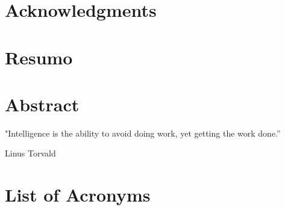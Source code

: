 \documentclass[a4paper, 12pt]{report}
\begin{document}



\newpage
\thispagestyle{empty}
\mbox{}

\chapter*{Acknowledgments}


\chapter*{Resumo}


\chapter*{Abstract}

\newpage\null\thispagestyle{empty}\newpage

\setlength\epigraphwidth{12cm}
\setlength\epigraphrule{0pt}
\makeatletter
{}
\makeatother
\vspace*{\fill}
\epigraph{"Intelligence is the ability to avoid doing work, yet getting the work done.”}
{Linus Torvald}
\vspace*{\fill}
\newpage\null\thispagestyle{empty}\newpage
\pagestyle{plain}
\tableofcontents
\chapter*{List of Acronyms}

\listoffigures
\listoftables
\newpage
\thispagestyle{empty}
\mbox{}

\end{document}

